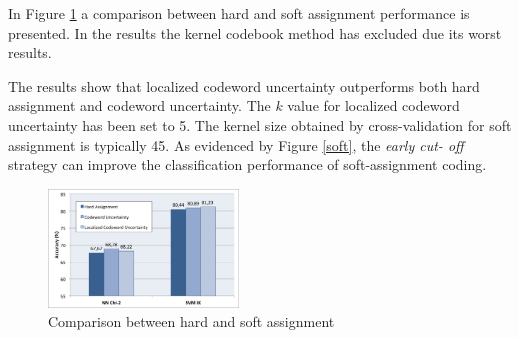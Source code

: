 In Figure \ref{fig:soft} a comparison between hard and soft assignment performance is presented. In the results the kernel codebook method has excluded due its worst results\cite{Gemert:2008:KCS:1478172.1478227}.

The results show that localized codeword uncertainty outperforms both hard assignment and codeword uncertainty. The $k$ value for localized codeword uncertainty has been set to 5. The kernel size obtained by cross-validation for soft assignment is typically 45. As evidenced by Figure \ref{soft}, the \emph{early cut- off} strategy can improve the classification performance of soft-assignment coding.

\begin{figure}[h]
\begin{center}
\includegraphics[width=0.45\textwidth]{images/soft-comparison.png}
\end{center}
  \caption{Comparison between hard and soft assignment}
\label{fig:soft}
\end{figure}
